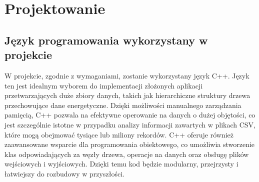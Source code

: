 \newpage
\section{Projektowanie}		%
\subsection{Język programowania wykorzystany w projekcie}
W projekcie, zgodnie z wymaganiami, zostanie wykorzystany język C++. Język ten jest idealnym wyborem do implementacji złożonych aplikacji przetwarzających duże zbiory danych, takich jak hierarchiczne struktury drzewa przechowujące dane energetyczne. Dzięki możliwości manualnego zarządzania pamięcią, C++ pozwala na efektywne operowanie na danych o dużej objętości, co jest szczególnie istotne w przypadku analizy informacji zawartych w plikach CSV, które mogą obejmować tysiące lub miliony rekordów. C++ oferuje również zaawansowane wsparcie dla programowania obiektowego, co umożliwia stworzenie klas odpowiadających za węzły drzewa, operacje na danych oraz obsługę plików wejściowych i wyjściowych. Dzięki temu kod będzie modularny, przejrzysty i łatwiejszy do rozbudowy w przyszłości.
